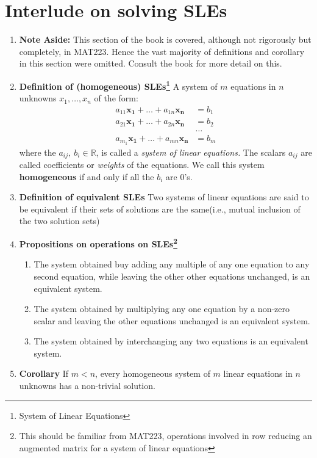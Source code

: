 \documentclass[oneside, 12pt]{book}
\newcommand{\settag}[1]{\renewcommand{\theenumi}{#1}}
\newcommand{\R}{\mathbb{R}}
\newcommand{\tbf}[1]{\textbf{#1}}
\newcommand{\tit}[1]{\textit{#1}}
\begin{document}
\section{Interlude on solving SLEs}
    \begin{enumerate}
        \settag{1.5.*}
        \item \tbf{Note Aside: }This section of the book is covered, although not rigorously but completely, in MAT223. Hence the vast majority of definitions and corollary in this section were omitted. Consult the book for more detail on this.
        
        \settag{1.5.1}
        \item \tbf{Definition of (homogeneous) SLEs\footnote{System of Linear Equations}} A system of $m$ equations in $n$ unknowns $x_1,\ldots,x_n$ of the form:
        \begin{align*}
            a_{11}\mathbf{x_1}+\ldots+a_{1n}\mathbf{x_n} &= b_1 \\
            a_{21}\mathbf{x_1}+\ldots+a_{2n}\mathbf{x_n} &= b_2 \\
            &\mbox{\ldots} \\
            a_{m_1}\mathbf{x_1}+\ldots+a_{mn}\mathbf{x_n} &= b_m
        \end{align*}
        where the $a_{ij},~b_i\in \R$, is called a \tit{system of linear equations.} The scalars $a_{ij}$ are called coefficients or \tit{weights} of the equations. We call this system \textbf{homogeneous} if and only if all the $b_i$ are 0's.
        
        \settag{1.5.2}
        \item \tbf{Definition of equivalent SLEs} Two systems of linear equations are said to be equivalent if their sets of solutions are the same(i.e., mutual inclusion of the two solution sets)
        
        \settag{1.5.3}
        \item \tbf{Propositions on operations on SLEs\footnote{This should be familiar from MAT223, operations involved in row reducing an augmented matrix for a system of linear equations}}
        \begin{enumerate}
            \item The system obtained buy adding any multiple of any one equation to any second equation, while leaving the other other equations unchanged, is an equivalent system.
            \item The system obtained by multiplying any one equation by a non-zero scalar and leaving the other equations unchanged is an equivalent system.
            \item The system obtained by interchanging any two equations is an equivalent system.
        \end{enumerate}
        
        \settag{1.5.13}
        \item \tbf{Corollary} If $m<n$, every homogeneous system of $m$ linear equations in $n$ unknowns has a non-trivial solution.
    \end{enumerate}
    
\end{document}
